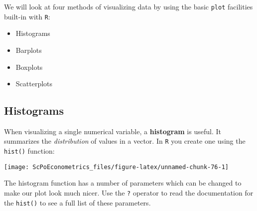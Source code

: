 \documentclass[]{book}
\newenvironment{Shaded}{\begin{snugshade}}{\end{snugshade}}
\newcommand{\CommentTok}[1]{\textcolor[rgb]{0.56,0.35,0.01}{\textit{#1}}}
\newcommand{\DataTypeTok}[1]{\textcolor[rgb]{0.13,0.29,0.53}{#1}}
\newcommand{\DecValTok}[1]{\textcolor[rgb]{0.00,0.00,0.81}{#1}}
\newcommand{\KeywordTok}[1]{\textcolor[rgb]{0.13,0.29,0.53}{\textbf{#1}}}
\newcommand{\NormalTok}[1]{#1}
\newcommand{\OperatorTok}[1]{\textcolor[rgb]{0.81,0.36,0.00}{\textbf{#1}}}
\newcommand{\StringTok}[1]{\textcolor[rgb]{0.31,0.60,0.02}{#1}}
\providecommand{\tightlist}{%
  \setlength{\itemsep}{0pt}\setlength{\parskip}{0pt}}
\begin{document}
We will look at four methods of visualizing data by using the basic \texttt{plot} facilities built-in with \texttt{R}:

\begin{itemize}
\tightlist
\item
  Histograms
\item
  Barplots
\item
  Boxplots
\item
  Scatterplots
\end{itemize}

\hypertarget{histograms}{%
\subsection{Histograms}\label{histograms}}

When visualizing a single numerical variable, a \textbf{histogram} is useful. It summarizes the \emph{distribution} of values in a vector. In \texttt{R} you create one using the \texttt{hist()} function:

\begin{Shaded}
\end{Shaded}

\begin{center}\texttt{[image: ScPoEconometrics\_files/figure-latex/unnamed-chunk-76-1]} \end{center}

The histogram function has a number of parameters which can be changed to make our plot look much nicer. Use the \texttt{?} operator to read the documentation for the \texttt{hist()} to see a full list of these parameters.

\begin{Shaded}
\end{Shaded}
\end{document}
